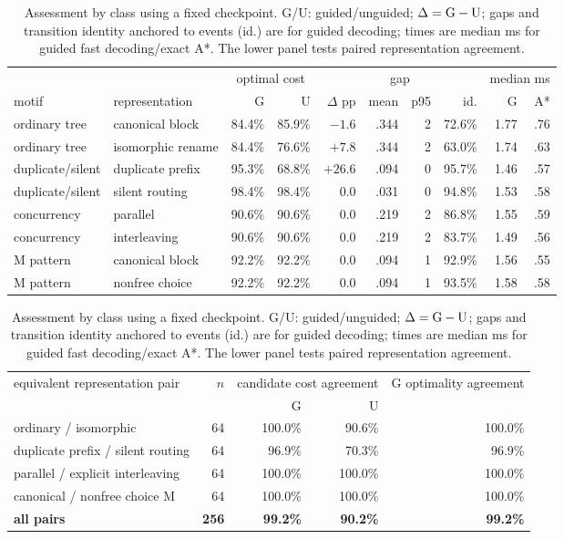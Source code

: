 \documentclass[manuscript,screen,nonacm]{acmart}
\begin{document}
\begin{table}[b]
\centering
\caption{Assessment by class using a fixed checkpoint. G/U: guided/unguided; $\Delta={\rm G}-{\rm U}$; gaps and transition identity anchored to events (id.) are for guided decoding; times are median ms for guided fast decoding/exact A*. The lower panel tests paired representation agreement.}
\label{tab:classes}
\scriptsize
\setlength{\tabcolsep}{2.4pt}
\begin{tabular}{@{}llrrrrrrrr@{}}
\toprule
& & \multicolumn{2}{c}{optimal cost} & & \multicolumn{2}{c}{gap} & & \multicolumn{2}{c}{median ms} \\
motif & representation & G & U & $\Delta$ pp & mean & p95 & id. & G & A* \\
\midrule
ordinary tree & canonical block & 84.4\% & 85.9\% & $-1.6$ & .344 & 2 & 72.6\% & 1.77 & .76 \\
ordinary tree & isomorphic rename & 84.4\% & 76.6\% & $+7.8$ & .344 & 2 & 63.0\% & 1.74 & .63 \\
duplicate/silent & duplicate prefix & 95.3\% & 68.8\% & \textbf{$+26.6$} & .094 & 0 & 95.7\% & 1.46 & .57 \\
duplicate/silent & silent routing & 98.4\% & 98.4\% & $0.0$ & .031 & 0 & 94.8\% & 1.53 & .58 \\
concurrency & parallel & 90.6\% & 90.6\% & $0.0$ & .219 & 2 & 86.8\% & 1.55 & .59 \\
concurrency & interleaving & 90.6\% & 90.6\% & $0.0$ & .219 & 2 & 83.7\% & 1.49 & .56 \\
M pattern & canonical block & 92.2\% & 92.2\% & $0.0$ & .094 & 1 & 92.9\% & 1.56 & .55 \\
M pattern & nonfree choice & 92.2\% & 92.2\% & $0.0$ & .094 & 1 & 93.5\% & 1.58 & .58 \\
\bottomrule
\end{tabular}

\vspace{4pt}
\begin{tabular}{@{}lrrrr@{}}
\toprule
equivalent representation pair & $n$ & \multicolumn{2}{c}{candidate cost agreement} & G optimality agreement \\
& & G & U & \\
\midrule
ordinary / isomorphic & 64 & 100.0\% & 90.6\% & 100.0\% \\
duplicate prefix / silent routing & 64 & 96.9\% & 70.3\% & 96.9\% \\
parallel / explicit interleaving & 64 & 100.0\% & 100.0\% & 100.0\% \\
canonical / nonfree choice M & 64 & 100.0\% & 100.0\% & 100.0\% \\
\textbf{all pairs} & \textbf{256} & \textbf{99.2\%} & \textbf{90.2\%} & \textbf{99.2\%} \\
\bottomrule
\end{tabular}
\end{table}
\end{document}
